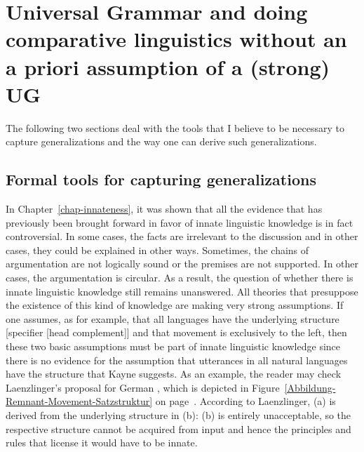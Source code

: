 
\chapter[Universal Grammar and comparative linguistics without UG]{Universal Grammar and doing comparative linguistics without an a priori assumption of a (strong) UG}
\label{Abschnitt-UG-mit-Hierarchie}

The following two sections deal with the tools that I believe to be necessary to capture
generalizations and the way one can derive such generalizations.

\section{Formal tools for capturing generalizations}

In Chapter~\ref{chap-innateness}, it was shown that all the evidence that has previously been
brought forward in favor of innate linguistic knowledge is in fact controversial. In some cases, the
facts are irrelevant to the discussion and in other cases, they could be explained in other
ways. Sometimes, the chains of argumentation are not logically sound or the premises are not
supported. In other cases, the argumentation is circular. As a result, the question of whether there
is innate linguistic knowledge still remains unanswered. All theories that presuppose the existence
of this kind of knowledge are making very strong assumptions. If one assumes, as \citet{Kayne94a-u}
for example, that all languages have the underlying structure [specifier [head complement]] and that
movement is exclusively to the left, then
these two basic assumptions must be part of innate linguistic knowledge since there is no evidence for the
assumption that utterances in all natural languages have the structure that Kayne suggests. As an
example, the reader may check Laenzlinger's proposal for German \citeyearpar[]{Laenzlinger2004a}, which is depicted in
Figure~\ref{Abbildung-Remnant-Movement-Satzstruktur} on
page~\pageref{Abbildung-Remnant-Movement-Satzstruktur}. According to Laenzlinger, (a) is derived from the underlying
structure in (b):
\eal
{}
\zl
(b) is entirely unacceptable, so the respective structure cannot be acquired from input and hence the
principles and rules that license it would have to be innate.

